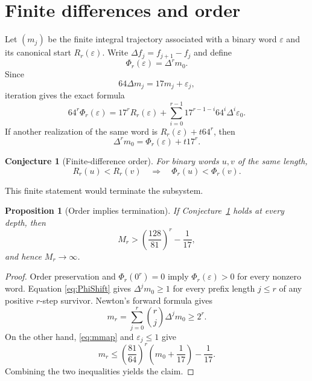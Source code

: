 \documentclass[11pt,reqno]{amsart}
\numberwithin{equation}{section}
\newtheorem{proposition}[theorem]{Proposition}
\newtheorem{conjecture}[theorem]{Conjecture}
\theoremstyle{definition}
\theoremstyle{remark}
\newcommand{\eps}{\varepsilon}
\begin{document}
\section{Finite differences and order}\label{sec:finitediff}

Let $(m_j)$ be the finite integral trajectory associated with a binary word $\eps$ and its canonical start $R_r(\eps)$.  Write $\Delta f_j=f_{j+1}-f_j$ and define
\begin{equation}\label{eq:Phi}
 \Phi_r(\eps)=\Delta^r m_0.
\end{equation}
Since
\[
 64\Delta m_j=17m_j+\eps_j,
\]
iteration gives the exact formula
\begin{equation}\label{eq:PhiFormula}
 64^r\Phi_r(\eps)
 =17^rR_r(\eps)
 +\sum_{i=0}^{r-1}
 17^{r-1-i}64^i\Delta^i\eps_0.
\end{equation}
If another realization of the same word is $R_r(\eps)+t64^r$, then
\begin{equation}\label{eq:PhiShift}
 \Delta^r m_0=\Phi_r(\eps)+t17^r.
\end{equation}

\begin{conjecture}[Finite-difference order]\label{conj:order}
For binary words $u,v$ of the same length,
\begin{equation}\label{eq:order}
 R_r(u)<R_r(v)
 \quad\Longrightarrow\quad
 \Phi_r(u)<\Phi_r(v).
\end{equation}
\end{conjecture}

This finite statement would terminate the subsystem.

\begin{proposition}[Order implies termination]\label{prop:ordertermination}
If Conjecture~\ref{conj:order} holds at every depth, then
\[
 M_r>
 \left(\frac{128}{81}\right)^r-\frac1{17},
\]
and hence $M_r\to\infty$.
\end{proposition}

\begin{proof}
Order preservation and $\Phi_r(0^r)=0$ imply $\Phi_r(\eps)>0$ for every nonzero word.  Equation \eqref{eq:PhiShift} gives $\Delta^j m_0\ge1$ for every prefix length $j\le r$ of any positive $r$-step survivor.  Newton's forward formula gives
\[
 m_r=\sum_{j=0}^r\binom rj\Delta^jm_0\ge2^r.
\]
On the other hand, \eqref{eq:mmap} and $\eps_j\le1$ give
\[
 m_r\le
 \left(\frac{81}{64}\right)^r
 \left(m_0+\frac1{17}\right)-\frac1{17}.
\]
Combining the two inequalities yields the claim.
\end{proof}
\end{document}
